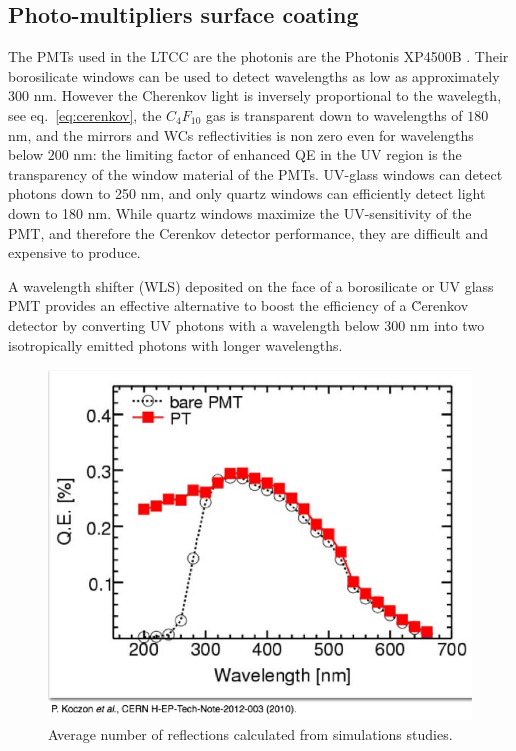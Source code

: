 \subsection{Photo-multipliers surface coating}

The PMTs used in the LTCC are the photonis are the Photonis XP4500B \cite{Photonis:2007ta}.
Their borosilicate windows can be used to detect wavelengths as low as approximately
$300$ nm. However the Cherenkov light is inversely proportional to the wavelegth, see eq.~\ref{eq:cerenkov},
the $C_4F_{10}$ gas is transparent down to wavelengths of $180$ nm, and the mirrors and WCs reflectivities is non zero
even for wavelengths below $200$ nm: the limiting factor of enhanced QE in the UV region
is the transparency of the window material of the PMTs. UV-glass windows can detect photons down to
250 nm, and only quartz windows can efficiently detect light down to 180 nm. While quartz windows maximize the UV-sensitivity
of the PMT, and therefore the Cerenkov detector performance, they are difficult and expensive to produce.

A wavelength shifter (WLS) deposited on the face of a borosilicate or UV glass
PMT provides an effective alternative to boost the efficiency of a \u{C}erenkov
detector by converting UV photons with a wavelength below $300$ nm into two
isotropically emitted photons with longer wavelengths.



\begin{figure}
	\centering
	\includegraphics[width=1.0\columnwidth,keepaspectratio]{img/pmtQuantumEfficiencyGain.png}
	\caption{Average number of reflections calculated from simulations studies.}
	\label{fig:pmtQuantumEfficiencyGain}
\end{figure}

